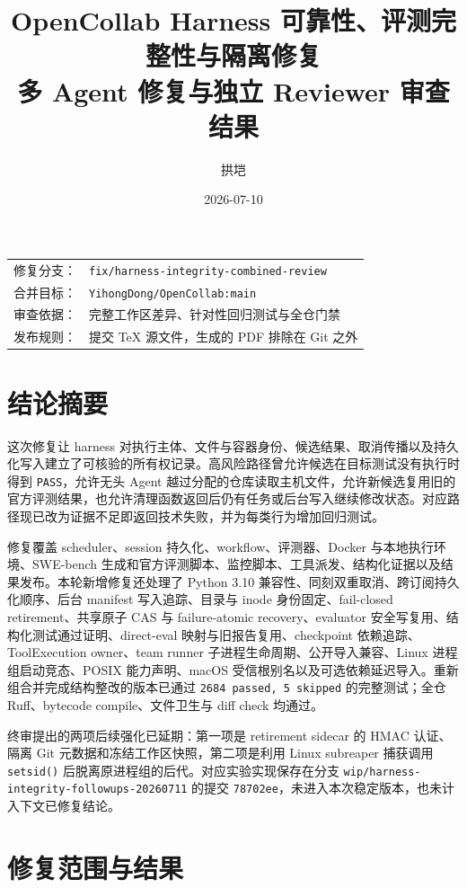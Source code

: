 \documentclass[11pt,a4paper,fontset=fandol]{ctexart}
\title{\textbf{OpenCollab Harness 可靠性、评测完整性与隔离修复}\\
\large 多 Agent 修复与独立 Reviewer 审查结果}
\author{拱垲}
\date{2026-07-10}
\newcommand{\code}[1]{\texttt{#1}}
\begin{document}
\maketitle

\begin{center}
\begin{tabular}{rl}
修复分支： & \code{fix/harness-integrity-combined-review} \\
合并目标： & \code{YihongDong/OpenCollab:main} \\
审查依据： & 完整工作区差异、针对性回归测试与全仓门禁 \\
发布规则： & 提交 TeX 源文件，生成的 PDF 排除在 Git 之外 \\
\end{tabular}
\end{center}

\section{结论摘要}

这次修复让 harness 对执行主体、文件与容器身份、候选结果、取消传播以及持久化写入建立了可核验的所有权记录。高风险路径曾允许候选在目标测试没有执行时得到 \code{PASS}，允许无头 Agent 越过分配的仓库读取主机文件，允许新候选复用旧的官方评测结果，也允许清理函数返回后仍有任务或后台写入继续修改状态。对应路径现已改为证据不足即返回技术失败，并为每类行为增加回归测试。

修复覆盖 scheduler、session 持久化、workflow、评测器、Docker 与本地执行环境、SWE-bench 生成和官方评测脚本、监控脚本、工具派发、结构化证据以及结果发布。本轮新增修复还处理了 Python 3.10 兼容性、同刻双重取消、跨订阅持久化顺序、后台 manifest 写入追踪、目录与 inode 身份固定、fail-closed retirement、共享原子 CAS 与 failure-atomic recovery、evaluator 安全写复用、结构化测试通过证明、direct-eval 映射与旧报告复用、checkpoint 依赖追踪、ToolExecution owner、team runner 子进程生命周期、公开导入兼容、Linux 进程组启动竞态、POSIX 能力声明、macOS 受信根别名以及可选依赖延迟导入。重新组合并完成结构整改的版本已通过 \code{2684 passed, 5 skipped} 的完整测试；全仓 Ruff、bytecode compile、文件卫生与 diff check 均通过。

终审提出的两项后续强化已延期：第一项是 retirement sidecar 的 HMAC 认证、隔离 Git 元数据和冻结工作区快照，第二项是利用 Linux subreaper 捕获调用 \code{setsid()} 后脱离原进程组的后代。对应实验实现保存在分支 \code{wip/harness-integrity-followups-20260711} 的提交 \code{78702ee}，未进入本次稳定版本，也未计入下文已修复结论。

\section{修复范围与结果}
\end{document}

